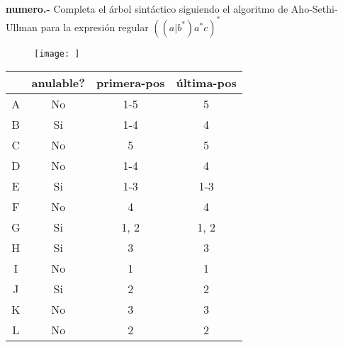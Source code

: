 \paragraph{}
\textbf{{numero}.-} Completa el árbol sintáctico siguiendo el algoritmo de Aho-Sethi-Ullman para la expresión regular $ ((a|b^*)a^*c)^* $
\begin{figure}[ht!]
\centering
\texttt{[image: ]}
\end{figure}

\begin{tabular} {| c | c | c | c |}\hline
 & anulable? & primera-pos & última-pos\\ \hline
A & No & 1-5 & 5\\ \hline
B & Si & 1-4 & 4\\ \hline
C & No & 5 & 5\\ \hline
D & No & 1-4 & 4\\ \hline
E & Si & 1-3 & 1-3\\ \hline
F & No & 4 & 4\\ \hline
G & Si & 1, 2 & 1, 2\\ \hline
H & Si & 3 & 3\\ \hline
I & No & 1 & 1\\ \hline
J & Si & 2 & 2\\ \hline
K & No & 3 & 3\\ \hline
L & No & 2 & 2\\ \hline
\end{tabular}
